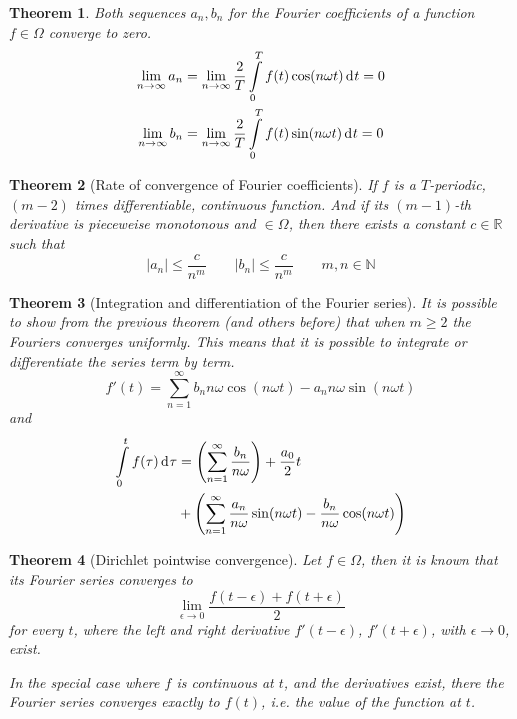 \documentclass[twocolumn, margin=small]{tex/hsrzf}
\newcommand\Nset{\mathbb{N}}
\newcommand\Rset{\mathbb{R}}
\newcommand\len[1]{\lvert#1\rvert}
\theoremstyle{komfourzf}
\newtheorem{theorem}{Theorem}
\begin{document}
\begin{theorem} Both sequences \(a_n, b_n\) for the Fourier coefficients of a function \(f\in\Omega\) converge to zero.
  \begin{align*}
    \lim_{n\to\infty} a_n 
      &= \lim_{n\to\infty} \frac{2}{T}
          \int\limits_0^T f(t) \cos(n\omega t) \,\mathrm{d}^{} t = 0 \\
    \lim_{n\to\infty} b_n 
      &= \lim_{n\to\infty} \frac{2}{T}
          \int\limits_0^T f(t) \sin(n\omega t) \,\mathrm{d}^{} t = 0
  \end{align*}
\end{theorem}

\begin{theorem}[Rate of convergence of Fourier coefficients]
  If \(f\) is a \(T\)-periodic, \((m-2)\) times differentiable, continuous function. And if its \((m-1)\)-th derivative is pieceweise monotonous and \(\in \Omega\), then there exists a constant \(c \in\Rset\) such that
  \[
    \len{a_n} \leq \frac{c}{n^m} \qquad \len{b_n} \leq \frac{c}{n^m} \qquad m,n\in\Nset
  \]
\end{theorem}

\begin{theorem}[Integration and differentiation of the Fourier series]
  It is possible to show from the previous theorem (and others before) that when \(m\geq 2\) the Fouriers converges \emph{uniformly}. This means that it is possible to integrate or differentiate the series term by term.
  \[
    f'(t) = \sum_{n=1}^\infty b_n n\omega\cos(n\omega t) - a_n n\omega\sin(n\omega t)
  \]
  and
  \begin{align*}
    \int\limits_0^t f(\tau) \,\mathrm{d}^{} \tau &=
      \left(\sum_{n=1}^\infty \frac{b_n}{n\omega} \right)
      + \frac{a_0}{2} t \\
      &+ \left(\sum_{n=1}^\infty
          \frac{a_n}{n\omega}\sin(n\omega t)
          - \frac{b_n}{n\omega}\cos(n\omega t)
        \right)
  \end{align*}
\end{theorem}

\begin{theorem}[Dirichlet pointwise convergence]
  Let \(f\in\Omega\), then it is known that its Fourier series converges to
  \[
    \lim_{\epsilon\to 0}\frac{f(t-\epsilon) + f(t+\epsilon)}{2}
  \]
  for every \(t\), where the left and right derivative \(f'(t-\epsilon)\), \(f'(t+\epsilon)\), with \(\epsilon\to 0\), exist.

  In the special case where \(f\) is continuous at \(t\), and the derivatives exist, there the Fourier series converges exactly to \(f(t)\), i.e. the value of the function at \(t\).
\end{theorem}
\end{document}
